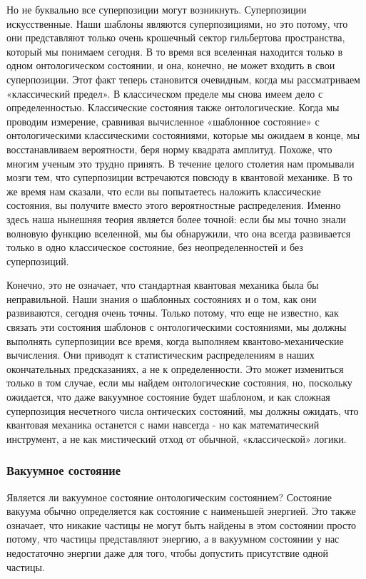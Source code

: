 \documentclass[main.tex]{subfiles}
\begin{document}
Но не буквально все суперпозиции могут возникнуть. Суперпозиции искусственные. Наши шаблоны являются суперпозициями, но это потому, что они представляют только очень крошечный сектор гильбертова пространства, который мы понимаем сегодня. В то время вся вселенная находится только в одном онтологическом состоянии, и она, конечно, не может входить в свои суперпозиции. Этот факт теперь становится очевидным, когда мы рассматриваем «классический предел». В классическом пределе мы снова имеем дело с определенностью. Классические состояния также онтологические. Когда мы проводим измерение, сравнивая вычисленное «шаблонное состояние» с онтологическими классическими состояниями, которые мы ожидаем в конце, мы восстанавливаем вероятности, беря норму квадрата амплитуд.
Похоже, что многим ученым это трудно принять. В течение целого столетия нам промывали мозги тем, что суперпозиции встречаются повсюду в квантовой механике. В то же время нам сказали, что если вы попытаетесь наложить классические состояния, вы получите вместо этого вероятностные распределения. Именно здесь наша нынешняя теория является более точной: если бы мы точно знали волновую функцию вселенной, мы бы обнаружили, что она всегда развивается только в одно классическое состояние, без неопределенностей и без суперпозиций.

Конечно, это не означает, что стандартная квантовая механика была бы неправильной. Наши знания о шаблонных состояниях и о том, как они развиваются, сегодня очень точны. Только потому, что еще не известно, как связать эти состояния шаблонов с онтологическими состояниями, мы должны выполнять суперпозиции все время, когда выполняем квантово-механические вычисления. Они приводят к статистическим распределениям в наших окончательных предсказаниях, а не к определенности. Это может измениться только в том случае, если мы найдем онтологические состояния, но, поскольку ожидается, что даже вакуумное состояние будет шаблоном, и как сложная суперпозиция несчетного числа онтических состояний, мы должны ожидать, что квантовая механика останется с нами навсегда - но как математический инструмент, а не как мистический отход от обычной, «классической» логики.

\subsubsection{Вакуумное состояние}\label{ch5.7.5}

Является ли вакуумное состояние онтологическим состоянием? Состояние вакуума обычно определяется как состояние с наименьшей энергией. Это также означает, что никакие частицы не могут быть найдены в этом состоянии просто потому, что частицы представляют энергию, а в вакуумном состоянии у нас недостаточно энергии даже для того, чтобы допустить присутствие одной частицы.
\end{document}

